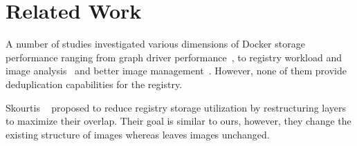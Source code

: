 \section{Related Work}
\label{sec:related}


A number of studies investigated various dimensions of Docker storage
performance ranging from graph driver performance~\cite{slacker,docker-driver-eval,improve-cow-container-drivers}, to registry workload and image analysis~\cite{dockerworkload,dedupanalysis}
and better image management~\cite{shifter,exoclones}. However, none
of them provide deduplication capabilities for the registry.

Skourtis \etal~\cite{skourtis2019carving} proposed to reduce registry storage utilization by
restructuring layers to maximize their overlap. Their goal is similar to ours, however, they change
the existing structure of images whereas \sysname leaves images unchanged.
%
%


